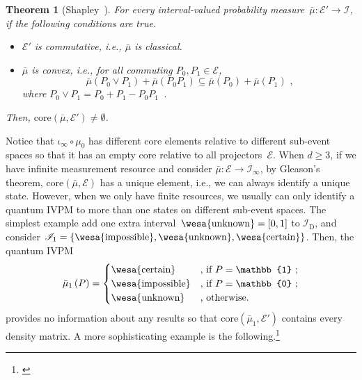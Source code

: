 \documentclass[english,reprint, aps, prl,superscriptaddress, showpacs,
showkeys, longbibliography, amsmath, amssymb]{revtex4-1}
\theoremstyle{plain}
\newtheorem{thm}{Theorem}
\theoremstyle{definition}
\newcommand{\events}{\ensuremath{\mathcal{E}}}
\newcommand{\imposs}{{\text{\wesa{impossible}}}}
\newcommand{\necess}{{\text{\wesa{certain}}}}
\newcommand{\unknown}{{\text{\wesa{unknown}}}}
\newcommand{\yutsung}[1]{\begin{framed}\begin{minipage}{0.9\linewidth}\color{purple}{Yu-Tsung says: #1}\end{minipage}\end{framed}}
\begin{document}
\begin{thm}[Shapley~\cite{Shapley1971,Grabisch2016}]\label{thm:Shapley}For
every interval-valued probability measure~$\bar{\mu}:\events'\rightarrow\mathscr{I}$,
if the following conditions are true.
\begin{itemize}
\item $\events'$ is commutative, i.e., $\bar{\mu}$ is classical.
\item $\bar{\mu}$ is convex, i.e., for all commuting $P_{0},P_{1}\in\events$,
\[
\bar{\mu}\left(P_{0}\vee P_{1}\right)+\bar{\mu}\left(P_{0}P_{1}\right)\subseteq\bar{\mu}\left(P_{0}\right)+\bar{\mu}\left(P_{1}\right)\textrm{ ,}
\]
where $P_{0}\vee P_{1}=P_{0}+P_{1}-P_{0}P_{1}$~\cite{Griffiths2003}.
\end{itemize}
Then, $\mathrm{core}\left(\bar{\mu},\events'\right)\ne\emptyset$.\end{thm}

\newpage{}

Notice that $\iota_{\infty}\circ\mu_{0}$ has different core elements
relative to different sub-event spaces so that it has an empty core
relative to all projectors~$\events$. When $d\ge3$, if we have
infinite measurement resource and consider $\bar{\mu}:\events\rightarrow\mathscr{I}_{\infty}$,
by Gleason's theorem, $\mathrm{core}\left(\bar{\mu},\events\right)$
has a unique element, i.e., we can always identify a unique state.
However, when we only have finite resources, we usually can only identify
a quantum IVPM to more than one states on different sub-event spaces.
The simplest example add one extra interval~$\unknown=\left[0,1\right]$
to $\mathscr{I}_{\mathrm{D}}$, and consider $\mathscr{I}_{1}=\left\{ \imposs,\unknown,\necess\right\} $.
Then, the quantum IVPM
\begin{equation}
\bar{\mu}_{1}\left(P\right)=\begin{cases}
\necess & \text{, if }P=\mathbb{1}\text{ ;}\\
\imposs & \text{, if }P=\mathbb{0}\text{ ;}\\
\unknown & \text{, otherwise.}
\end{cases}\label{eq:homomorphism-1}
\end{equation}
provides no information about any results so that $\mathrm{core}\left(\bar{\mu}_{1},\events'\right)$
contains every density matrix. A more sophisticating example is the
following.\footnote{\yutsung{It seems that our example in 4 dimensions together with
relativity core would be unnecessary complex. Therefore, I roll our
example back to 3 dimensions.}}
\end{document}
